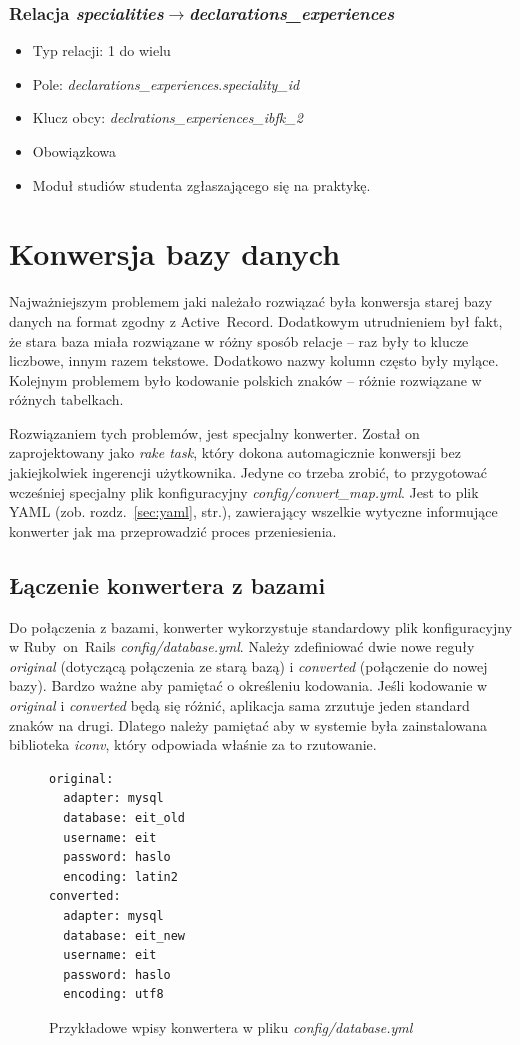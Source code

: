 \documentclass[a4paper,12pt,oneside]{report}
\begin{document}
\subsubsection{Relacja \emph{specialities}$\to$\emph{declarations\_experiences}}
\label{subsub:specialities-declarations_experiences}
\begin{itemize}
  \item Typ relacji: 1 do wielu
  \item Pole: \emph{declarations\_experiences}.\emph{speciality\_id}
  \item Klucz obcy: \emph{declrations\_experiences\_ibfk\_2}
  \item Obowiązkowa
  \item Moduł studiów studenta zgłaszającego się na praktykę.
\end{itemize}

\section{Konwersja bazy danych}
\label{sec:db-konwersja}
Najważniejszym problemem jaki należało rozwiązać była konwersja starej bazy danych na format zgodny z Active~Record. Dodatkowym utrudnieniem był fakt, że stara baza miała rozwiązane w różny sposób relacje -- raz były to klucze liczbowe, innym razem tekstowe. Dodatkowo nazwy kolumn często były mylące. Kolejnym problemem było kodowanie polskich znaków -- różnie rozwiązane w różnych tabelkach.

Rozwiązaniem tych problemów, jest specjalny konwerter. Został on zaprojektowany jako \emph{rake task}, który dokona automagicznie konwersji bez jakiejkolwiek ingerencji użytkownika. Jedyne co trzeba zrobić, to przygotować wcześniej specjalny plik konfiguracyjny \emph{config/convert\_map.yml}. Jest to plik YAML (zob. rozdz.~\ref{sec:yaml}, str.\pageref{sec:yaml}), zawierający wszelkie wytyczne informujące konwerter jak ma przeprowadzić proces przeniesienia.

\subsection{Łączenie konwertera z bazami}
\label{sub:convert-base}
Do połączenia z bazami, konwerter wykorzystuje standardowy plik konfiguracyjny w Ruby~on~Rails \emph{config/database.yml}. Należy zdefiniować dwie nowe reguły \emph{original} (dotyczącą połączenia ze starą bazą) i \emph{converted} (połączenie do nowej bazy). Bardzo ważne aby pamiętać o określeniu kodowania. Jeśli kodowanie w \emph{original} i \emph{converted} będą się różnić, aplikacja sama zrzutuje jeden standard znaków na drugi. Dlatego należy pamiętać aby w systemie była zainstalowana biblioteka \emph{iconv}, który odpowiada właśnie za to rzutowanie.
\begin{figure}[h]
\centering
\begin{verbatim}original:
  adapter: mysql
  database: eit_old
  username: eit
  password: haslo
  encoding: latin2
converted:
  adapter: mysql
  database: eit_new
  username: eit
  password: haslo
  encoding: utf8\end{verbatim}
\caption{Przykładowe wpisy konwertera w pliku \emph{config/database.yml}\label{fig:database-yml}}
\end{figure}
\end{document}
